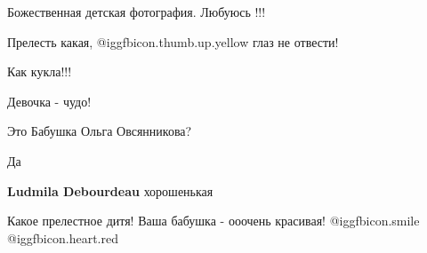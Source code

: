 
 
 
 
 

Божественная детская фотография. Любуюсь !!!

Прелесть какая,  @igg{fbicon.thumb.up.yellow}  глаз не отвести!

Как кукла!!!

Девочка - чудо!

Это Бабушка Ольга Овсянникова?

Да

\textbf{Ludmila Debourdeau} хорошенькая


Какое прелестное дитя! Ваша бабушка - ооочень красивая! @igg{fbicon.smile}
@igg{fbicon.heart.red}
